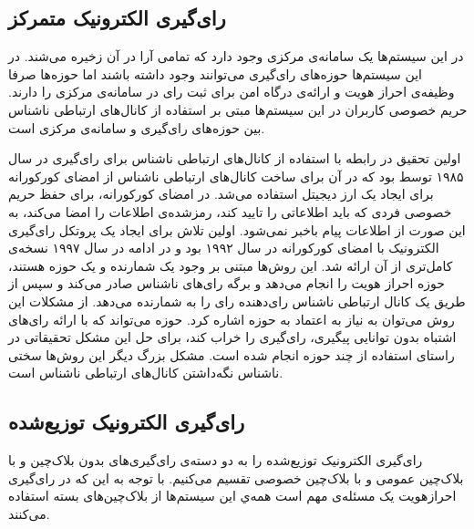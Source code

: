 \subsection{رای‌گیری الکترونیک متمرکز}
در این سیستم‌ها یک سامانه‌ی مرکزی وجود دارد که تمامی آرا در آن زخیره می‌شند. در این سیستم‌ها حوزه‌های رای‌گیری می‌توانند وجود داشته باشند اما حوزه‌ها صرفا وظیفه‌ی احراز هویت و ارائه‌ی درگاه امن برای ثبت رای در سامانه‌ی مرکزی را دارند. حریم خصوصی کاربران در این سیستم‌ها مبتی بر استفاده از کانال‌های ارتباطی ناشناس 
بین حوزه‌های رای‌گیری و سامانه‌ی مرکزی است.
\par
 اولین تحقیق در رابطه با استفاده‌ از کانال‌های ارتباطی ناشناس برای رای‌گیری در سال ۱۹۸۵ توسط 
\cite{Chaum}
بود که در آن برای ساخت‌ کانال‌های ارتباطی ناشناس از امضای کورکورانه 
\cite{blindsig}
برای ایجاد یک ارز دیجیتل استفاده می‌شد. در امضای کورکورانه، برای حفظ حریم خصوصی فردی که باید اطلاعاتی را تایید کند، رمزشده‌ی اطلاعات را امضا می‌کند، به این صورت از اطلاعات پیام باخبر نمی‌شود. اولین تلاش برای ایجاد یک پروتکل رای‌گیری الکترونیک با امضای کورکورانه در سال ۱۹۹۲ 
\cite{foo92}
بود و در ادامه در سال ۱۹۹۷
\cite{improveblind}
نسخه‌ی کامل‌تری از آن ارائه شد. این روش‌ها مبتنی بر وجود یک شمارنده و یک حوزه هستند، حوزه احراز هویت را انجام می‌دهد و برگه‌ رای‌های ناشناس صادر می‌کند و سپس از طریق یک کانال ارتباطی ناشناس رای‌دهنده رای را به شمارنده می‌دهد. از مشکلات این روش می‌توان به نیاز به اعتماد به حوزه اشاره کرد. حوزه می‌تواند که با ارائه رای‌های اشتباه بدون توانایی پیگیری، رای‌گیری را خراب کند، برای حل این مشکل تحقیقاتی
\cite{multiteller}
 در راستای استفاده از چند حوزه انجام شده است. مشکل بزرگ دیگر این روش‌ها
\cite{anonchan}
  سختی ناشناس نگه‌داشتن کانال‌های ارتباطی ناشناس است.

\subsection{رای‌گیری الکترونیک توزیع‌شده}
رای‌گیری الکترونیک توزیع‌شده را به دو دسته‌ی رای‌گیری‌های بدون بلاک‌چین و با بلاک‌چین عمومی و با بلاک‌چین خصوصی تقسیم می‌کنیم. با توجه به این که در رای‌گیری احرازهویت یک مسئله‌ی مهم است همه‌ي این سیستم‌ها از بلاک‌چین‌های بسته استفاده می‌کنند.
